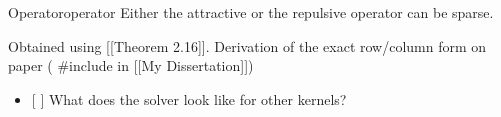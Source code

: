 \begin{definition}{Operator}{operator}
  Either the attractive or the repulsive operator can be sparse.

  Obtained using {[}{[}Theorem 2.16{]}{]}. Derivation of the exact
  row/column form on paper ( \#include in {[}{[}My Dissertation{]}{]})

  \begin{itemize}
    \tightlist
    \item
          {[} {]} What does the solver look like for other kernels?
  \end{itemize}
\end{definition}
